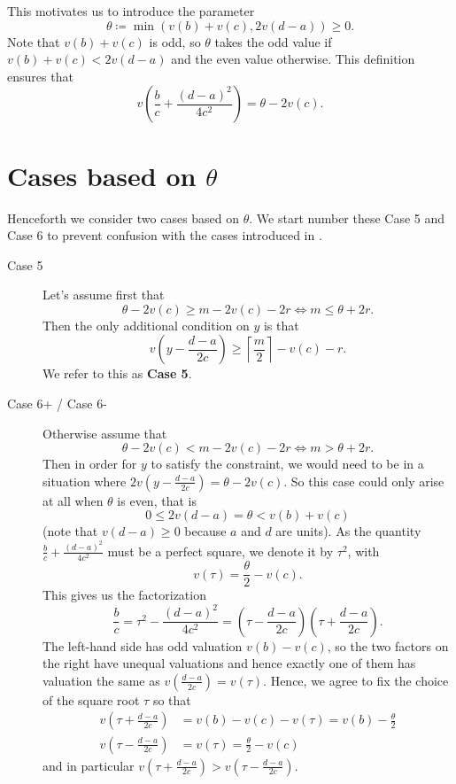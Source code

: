 This motivates us to introduce the parameter
\[ \theta \coloneqq \min \left( v(b)+v(c), 2v(d-a) \right) \ge 0. \]
Note that $v(b) + v(c)$ is odd,
so $\theta$ takes the odd value if $v(b)+v(c) < 2v(d-a)$ and the even value otherwise.
This definition ensures that
\[ v \left( \frac bc + \frac{(d-a)^2}{4c^2} \right) = \theta - 2v(c). \]

\section{Cases based on $\theta$}
Henceforth we consider two cases based on $\theta$.
We start number these Case 5 and Case 6 to prevent confusion
with the cases introduced in .
\begin{description}
  \item[Case 5]
  Let's assume first that
  \[ \theta - 2v(c) \ge m - 2v(c) - 2r \iff m \le \theta + 2r. \]
  Then the only additional condition on $y$ is that
  \[
    v\left( y - \frac{d-a}{2c} \right)
    \ge \left\lceil \frac{m}{2} \right\rceil - v(c) - r.
  \]
  We refer to this as \textbf{Case 5}.

  \item[Case 6\ts+ / Case 6\ts-]
  Otherwise assume that
  \[ \theta - 2v(c) < m - 2v(c) - 2r \iff m > \theta + 2r. \]
  Then in order for $y$ to satisfy the constraint,
  we would need to be in a situation where $2v(y - \frac{d-a}{2c}) = \theta - 2v(c)$.
  So this case could only arise at all when $\theta$ is even, that is
  \[ 0 \le 2v(d-a) = \theta < v(b) + v(c) \]
  (note that $v(d-a) \ge 0$ because $a$ and $d$ are units).
  As the quantity $\frac bc + \frac{(d-a)^2}{4c^2}$ must be a perfect square,
  we denote it by $\tau^2$, with
  \[ v(\tau) = \frac{\theta}{2} - v(c). \]
  This gives us the factorization
  \[ \frac bc = \tau^2 - \frac{(d-a)^2}{4c^2}
    = \left( \tau - \frac{d-a}{2c} \right) \left( \tau + \frac{d-a}{2c} \right). \]
  The left-hand side has odd valuation $v(b) - v(c)$,
  so the two factors on the right have unequal valuations
  and hence exactly one of them has valuation the same as $v(\frac{d-a}{2c}) = v(\tau)$.
  Hence, we agree to fix the choice of the square root $\tau$ so that
  \begin{align*}
    v\left( \tau + \frac{d-a}{2c} \right) &= v(b) - v(c) - v(\tau) = v(b) - \frac{\theta}{2} \\
    v\left( \tau - \frac{d-a}{2c} \right) &= v(\tau) = \frac{\theta}{2} - v(c)
  \end{align*}
  and in particular
  $v\left( \tau + \frac{d-a}{2c} \right) > v\left( \tau - \frac{d-a}{2c} \right)$.


\end{description}
